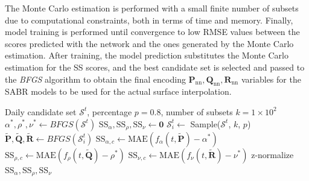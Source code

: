 The Monte Carlo estimation is performed with a small finite number of subsets due to computational constraints, both in terms of time and memory.
Finally, model training is performed until convergence to low RMSE values between the scores predicted
with the network and the ones generated by the Monte Carlo estimation.
After training, the model prediction substitutes the Monte Carlo estimation for the SS scores,
and the best candidate set is selected and passed to the \textit{BFGS}
algorithm to obtain the final encoding $\textbf{P}_{\text{nn}}, \textbf{Q}_{\text{nn}}, \textbf{R}_{\text{nn}}$
variables for the SABR models to be used for the actual surface interpolation.

\begin{algorithm}
    \begin{algorithmic}[1]
        \Require Daily candidate set $\mathcal{S}^{t}$, percentage $p=0.8$, number of subsets $k=1 \times 10^2$
        \State $\alpha^{*}, \rho^{*}, \nu^{*} \gets \textit{BFGS} (\mathcal{S}^{t})$
        \State $\text{SS}_{\alpha}, \text{SS}_{\rho}, \text{SS}_{\nu} \gets \mathbf{0}$
            \State $\mathcal{S}_{i}^{t} \gets$ Sample($\mathcal{S}^{t}$, $k$, $p$)
            \State $\widetilde{\textbf{P}}, \widetilde{\textbf{Q}}, \widetilde{\textbf{R}} \gets \textit{BFGS}(\mathcal{S}_{i}^{t})$
            \State $\text{SS}_{\alpha, c} \gets \text{MAE}(f_{\alpha}(t, \widetilde{\textbf{P}}) - \alpha^{*})$
            \State $\text{SS}_{\rho, c} \gets \text{MAE}(f_{\rho}(t, \widetilde{\textbf{Q}}) - \rho^{*})$
            \State $\text{SS}_{\nu, c} \gets \text{MAE}(f_{\nu}(t, \widetilde{\textbf{R}}) - \nu^{*})$
        \EndFor
        \State z-normalize $\text{SS}_{\alpha}, \text{SS}_{\rho}, \text{SS}_{\nu}$
    \end{algorithmic}
    \caption{Monte Carlo Estimation of normalized Target SS Scores}
    \label{alg:mc}
\end{algorithm}
